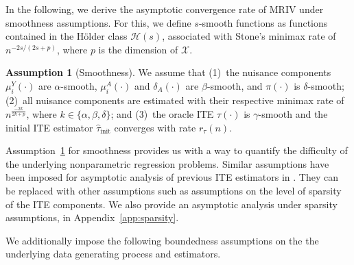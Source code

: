 \documentclass[nonatbib]{article}
\newcommand{\frameworkname}{MRIV\xspace}
\theoremstyle{definition}
\newtheorem{assumption}{Assumption}
\theoremstyle{plain}
\begin{document}
In the following, we derive the asymptotic convergence rate of \frameworkname under smoothness assumptions. For this, we define $s$-smooth functions as functions contained in the Hölder class $\mathcal{H}(s)$, associated with Stone's minimax rate \cite{Stone.1980} of $n^{-2s/(2s+p)}$, where $p$ is the dimension of $\mathcal{X}$.

\begin{assumption}[Smoothness]\label{ass:smoothness}
We assume that (1)~the nuisance components $\mu_i^Y(\cdot)$ are $\alpha$-smooth, $\mu_i^A(\cdot)$ and $\delta_A(\cdot)$ are $\beta$-smooth, and $\pi(\cdot)$ is $\delta$-smooth; (2)~all nuisance components are estimated with their respective minimax rate of $n^{\frac{-2k}{2k+p}}$, where $k \in \{\alpha, \beta, \delta\}$; and (3)~the oracle ITE $\tau(\cdot)$ is $\gamma$-smooth and the initial ITE estimator $\hat{\tau}_{\mathrm{init}}$ converges with rate $r_{\tau}(n)$.
\end{assumption}

Assumption~\ref{ass:smoothness} for smoothness provides us with a way to quantify the difficulty of the underlying nonparametric regression problems. Similar assumptions have been imposed for asymptotic analysis of previous ITE estimators in \cite{Kennedy.2020, Curth.2021}. They can be replaced with other assumptions such as assumptions on the level of sparsity of the ITE components. We also provide an asymptotic analysis under sparsity assumptions, in Appendix~\ref*{app:sparsity}. 

We additionally impose the following boundedness assumptions on the the underlying data generating process and estimators.
\end{document}
